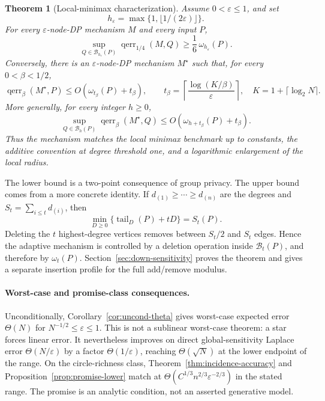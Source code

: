 \documentclass[11pt]{article}
\newtheorem{theorem}{Theorem}[section]
\newcommand{\eps}{\varepsilon}
\newcommand{\tail}{\operatorname{tail}}
\begin{document}
\begin{theorem}[Local-minimax characterization]
\label{thm:main-local}
Assume \(0<\eps\le1\), and set
\[
h_\eps=\max\{1,\lfloor1/(2\eps)\rfloor\}.
\]
For every \(\eps\)-node-DP mechanism \(M\) and every input \(P\),
\[
\sup_{Q\in\mathcal B_{h_\eps}(P)}
\operatorname{qerr}_{1/4}(M,Q)
\ge \frac{1}{6}\,\omega_{h_\eps}(P).
\]
Conversely, there is an \(\eps\)-node-DP mechanism \(M^\star\) such that, for every \(0<\beta<1/2\),
\[
\operatorname{qerr}_\beta(M^\star,P)
\le O\!\left(\omega_{t_\beta}(P)+t_\beta\right),
\qquad
t_\beta=\left\lceil\frac{\log(K/\beta)}{\eps}\right\rceil,
\quad K=1+\lceil\log_2N\rceil.
\]
More generally, for every integer \(h\ge0\),
\[
\sup_{Q\in\mathcal B_h(P)}
\operatorname{qerr}_\beta(M^\star,Q)
\le O\!\left(\omega_{h+t_\beta}(P)+t_\beta\right).
\]
Thus the mechanism matches the local minimax benchmark up to constants, the additive convention at degree threshold one, and a logarithmic enlargement of the local radius.
\end{theorem}

The lower bound is a two-point consequence of group privacy. The upper bound comes from a more concrete identity. If \(d_{(1)}\ge\cdots\ge d_{(n)}\) are the degrees and \(S_t=\sum_{i\le t}d_{(i)}\), then
\[
\min_{D\ge0}\{\tail_D(P)+tD\}=S_t(P).
\]
Deleting the \(t\) highest-degree vertices removes between \(S_t/2\) and \(S_t\) edges. Hence the adaptive mechanism is controlled by a deletion operation inside \(\mathcal B_t(P)\), and therefore by \(\omega_t(P)\). Section~\ref{sec:down-sensitivity} proves the theorem and gives a separate insertion profile for the full add/remove modulus.

\paragraph{Worst-case and promise-class consequences.}
Unconditionally, Corollary~\ref{cor:uncond-theta} gives worst-case expected error \(\Theta(N)\) for \(N^{-1/2}\le\eps\le1\). This is not a sublinear worst-case theorem: a star forces linear error. It nevertheless improves on direct global-sensitivity Laplace error \(\Theta(N/\eps)\) by a factor \(\Theta(1/\eps)\), reaching \(\Theta(\sqrt N)\) at the lower endpoint of the range. On the circle-richness class, Theorem~\ref{thm:incidence-accuracy} and Proposition~\ref{prop:promise-lower} match at \(\Theta(C^{1/3}n^{2/3}\eps^{-2/3})\) in the stated range. The promise is an analytic condition, not an asserted generative model.
\end{document}
